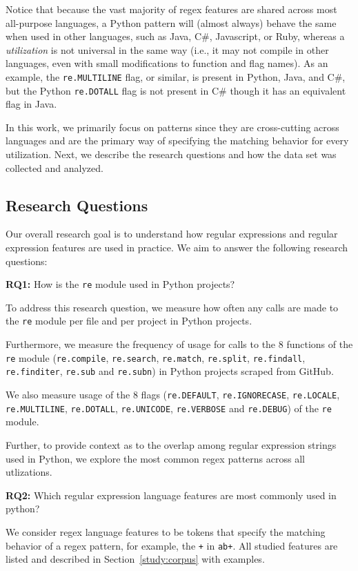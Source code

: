 Notice that because the vast majority of regex features are shared across most all-purpose languages, a Python {pattern} will (almost always) behave the same when used in other languages, such as Java, C\#, Javascript, or Ruby, whereas a \emph{utilization} is not universal in the same way (i.e., it may not compile in other languages, even with small modifications to function and flag names). As an example, the {\tt re.MULTILINE} flag, or similar, is present in Python, Java, and C\#, but  the Python {\tt re.DOTALL} flag is not present in C\# though it has an equivalent flag in Java.  

In this work, we primarily focus on patterns since they are cross-cutting across languages and are the primary way of specifying the matching behavior for every utilization. Next, we describe the research questions and how the data set was collected and analyzed.

\subsection{Research Questions}
\label{sec:rqs}
Our overall research goal is to understand how regular expressions and regular expression features are used in practice. We aim to answer the following research questions:

\textbf{RQ1:} How  is the {\tt re} module used in Python projects?

To address this research question, we measure how often any calls are made to the {\tt re} module per file and per project in Python projects.

Furthermore, we measure the frequency of usage for calls to the 8 functions of the {\tt re} module ({\tt re.compile}, {\tt re.search}, {\tt re.match}, {\tt re.split}, {\tt re.findall}, {\tt re.finditer}, {\tt re.sub} and {\tt re.subn}) in Python projects scraped from GitHub.

We also measure usage of the 8 flags ({\tt re.DEFAULT}, {\tt re.IGNORECASE}, {\tt re.LOCALE}, {\tt re.MULTILINE}, {\tt re.DOTALL}, {\tt re.UNICODE}, {\tt re.VERBOSE} and {\tt re.DEBUG}) of the {\tt re} module.

Further, to provide context as to the overlap among regular expression strings used in Python, we explore the most common regex {patterns} across all utlizations.

\textbf{RQ2:} Which regular expression language features are most commonly used in python?

We consider regex language features to be tokens that specify the matching behavior of a regex pattern, for example,  the {\tt +} in {\tt ab+}.  All studied features are listed and described in Section~\ref{study:corpus} with examples.

